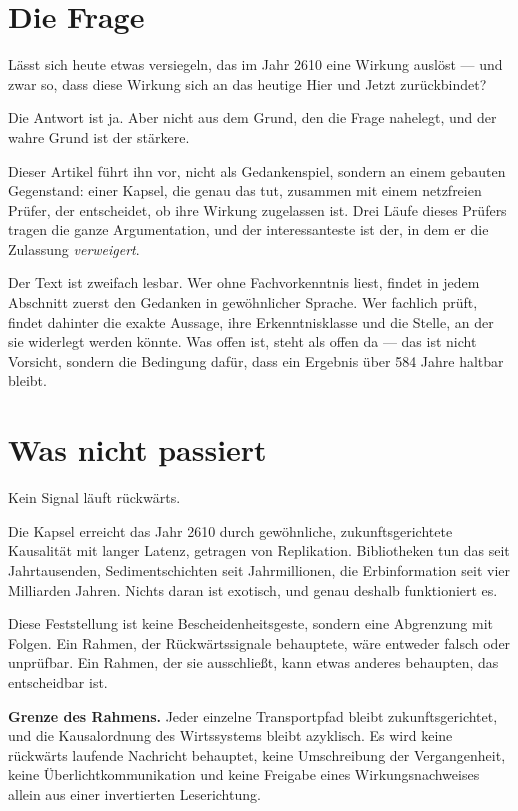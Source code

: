 \documentclass[11pt,a4paper]{article}
\theoremstyle{remark}
\newcommand{\statusbox}[2]{%
  \par\medskip\noindent
  \colorbox{#1}{\parbox{\dimexpr\linewidth-2\fboxsep\relax}{#2}}%
  \par\medskip
}
\begin{document}

\tableofcontents
\bigskip

\section{Die Frage}

Lässt sich heute etwas versiegeln, das im Jahr 2610 eine Wirkung auslöst
--- und zwar so, dass diese Wirkung sich an das heutige Hier und Jetzt
zurückbindet?

Die Antwort ist ja. Aber nicht aus dem Grund, den die Frage nahelegt, und
der wahre Grund ist der stärkere.

Dieser Artikel führt ihn vor, nicht als Gedankenspiel, sondern an einem
gebauten Gegenstand: einer Kapsel, die genau das tut, zusammen mit einem
netzfreien Prüfer, der entscheidet, ob ihre Wirkung zugelassen ist. Drei
Läufe dieses Prüfers tragen die ganze Argumentation, und der interessanteste
ist der, in dem er die Zulassung \emph{verweigert}.

Der Text ist zweifach lesbar. Wer ohne Fachvorkenntnis liest, findet in
jedem Abschnitt zuerst den Gedanken in gewöhnlicher Sprache. Wer fachlich
prüft, findet dahinter die exakte Aussage, ihre Erkenntnisklasse und die
Stelle, an der sie widerlegt werden könnte. Was offen ist, steht als offen
da --- das ist nicht Vorsicht, sondern die Bedingung dafür, dass ein
Ergebnis über 584 Jahre haltbar bleibt.

\section{Was nicht passiert}

Kein Signal läuft rückwärts.

Die Kapsel erreicht das Jahr 2610 durch gewöhnliche, zukunftsgerichtete
Kausalität mit langer Latenz, getragen von Replikation. Bibliotheken tun
das seit Jahrtausenden, Sedimentschichten seit Jahrmillionen, die
Erbinformation seit vier Milliarden Jahren. Nichts daran ist exotisch, und
genau deshalb funktioniert es.

Diese Feststellung ist keine Bescheidenheitsgeste, sondern eine Abgrenzung
mit Folgen. Ein Rahmen, der Rückwärtssignale behauptete, wäre entweder
falsch oder unprüfbar. Ein Rahmen, der sie ausschließt, kann etwas anderes
behaupten, das entscheidbar ist.

\statusbox{QLight}{
  \textbf{Grenze des Rahmens.} Jeder einzelne Transportpfad bleibt
  zukunftsgerichtet, und die Kausalordnung des Wirtssystems bleibt azyklisch.
  Es wird keine rückwärts laufende Nachricht behauptet, keine Umschreibung
  der Vergangenheit, keine Überlichtkommunikation und keine Freigabe eines
  Wirkungsnachweises allein aus einer invertierten Leserichtung.
}
\end{document}
